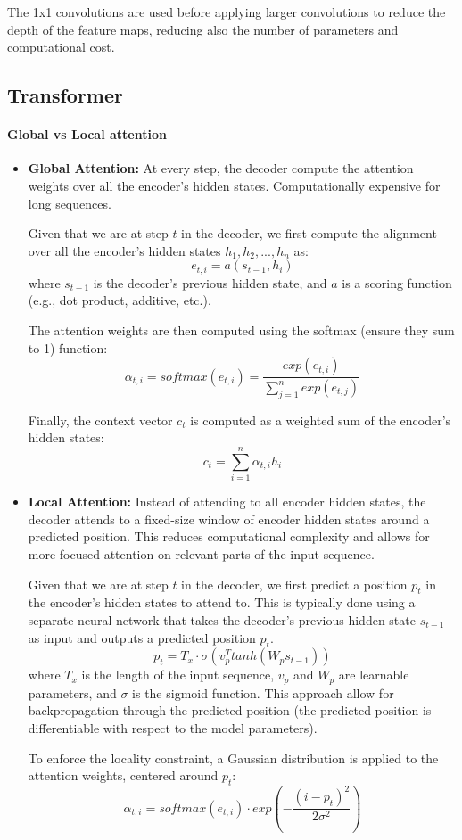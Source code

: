 The 1x1 convolutions are used before applying larger convolutions to reduce the depth of the feature maps, 
reducing also the number of parameters and computational cost.

\subsection{Transformer}
\paragraph{Global vs Local attention}
\begin{itemize}
    \item \textbf{Global Attention:} At every step, the decoder compute the attention weights over all the encoder's hidden states.
    Computationally expensive for long sequences.

    Given that we are at step $t$ in the decoder, we first compute the alignment over all the encoder's hidden states $h_1, h_2, ..., h_n$ as:
    \[ e_{t,i} = a(s_{t-1}, h_i) \]
    where $s_{t-1}$ is the decoder's previous hidden state, and $a$ is a scoring function (e.g., dot product, additive, etc.). 
    
    The attention weights are then computed using the softmax (ensure they sum to 1) function:
    \[ \alpha_{t,i} = softmax(e_{t,i}) = \frac{exp(e_{t,i})}{\sum_{j=1}^{n} exp(e_{t,j})} \]
    
    Finally, the context vector $c_t$ is computed as a weighted sum of the encoder's hidden states:
    \[ c_t = \sum_{i=1}^{n} \alpha_{t,i} h_i \]

    \item \textbf{Local Attention:} Instead of attending to all encoder hidden states, the decoder attends to a fixed-size window of encoder hidden states around a predicted position. 
    This reduces computational complexity and allows for more focused attention on relevant parts of the input sequence.

    Given that we are at step $t$ in the decoder, we first predict a position $p_t$ in the encoder's hidden states to attend to. 
    This is typically done using a separate neural network that takes the decoder's previous hidden state $s_{t-1}$ as input and outputs a predicted position $p_t$.
    \[ p_t = T_x \cdot \sigma(v_p^T tanh(W_p s_{t-1})) \]
    where $T_x$ is the length of the input sequence, $v_p$ and $W_p$ are learnable parameters, and $\sigma$ is the sigmoid function.
    This approach allow for backpropagation through the predicted position (the predicted position is differentiable with respect to the model parameters).
    
    To enforce the locality constraint, a Gaussian distribution is applied to the attention weights, centered around $p_t$:
    \[ \alpha_{t,i} = softmax(e_{t,i}) \cdot exp\left(-\frac{(i - p_t)^2}{2\sigma^2}\right) \]
\end{itemize}


